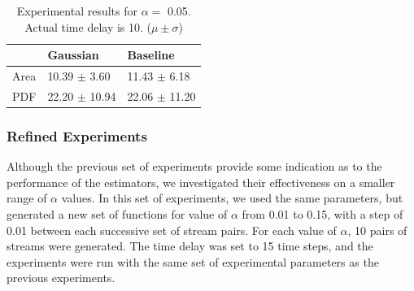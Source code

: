 \documentclass[a4paper,11pt]{article}
\begin{document}
\begin{table}[htb]

\begin{center}
\begin{tabular}{l|ll}
       &  Gaussian           &  Baseline           \\
\hline
 Area  &  10.39 $\pm$ 3.60   &  11.43 $\pm$ 6.18   \\
 PDF   &  22.20 $\pm$ 10.94  &  22.06 $\pm$ 11.20  \\
\end{tabular}
\end{center}
\caption{Experimental results for $\alpha=$ 0.05. Actual time delay is 10. ($\mu\pm\sigma$)} \label{fig:pretab}\end{table}
\subsubsection{Refined Experiments}
\label{sec-8-1-2}

    Although the previous set of experiments provide some indication as to the
performance of the estimators, we investigated their effectiveness on a smaller
range of $\alpha$ values. In this set of experiments, we used the same
parameters, but generated a new set of functions for value of $\alpha$ from
0.01 to 0.15, with a step of 0.01 between each successive set of stream
pairs. For each value of $\alpha$, 10 pairs of streams were generated. The time
delay was set to 15 time steps, and the experiments were run with the same set
of experimental parameters as the previous experiments.
\end{document}
